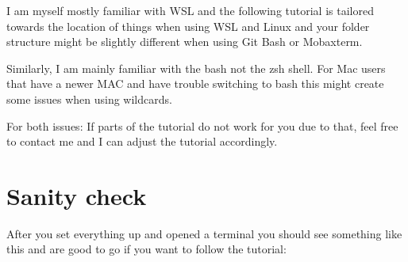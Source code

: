 \documentclass[
  letterpaper,
  DIV=11,
  numbers=noendperiod]{scrreprt}
\begin{document}
\begin{tcolorbox}[enhanced jigsaw, opacitybacktitle=0.6, leftrule=.75mm, colframe=quarto-callout-note-color-frame, breakable, colbacktitle=quarto-callout-note-color!10!white, rightrule=.15mm, opacityback=0, left=2mm, title=\textcolor{quarto-callout-note-color}{\faInfo}\hspace{0.5em}{Note}, coltitle=black, colback=white, toptitle=1mm, toprule=.15mm, titlerule=0mm, arc=.35mm, bottomrule=.15mm, bottomtitle=1mm]

I am myself mostly familiar with WSL and the following tutorial is
tailored towards the location of things when using WSL and Linux and
your folder structure might be slightly different when using Git Bash or
Mobaxterm.

Similarly, I am mainly familiar with the bash not the zsh shell. For Mac
users that have a newer MAC and have trouble switching to bash this
might create some issues when using wildcards.

For both issues: If parts of the tutorial do not work for you due to
that, feel free to contact me and I can adjust the tutorial accordingly.

\end{tcolorbox}

\section{Sanity check}\label{sanity-check}

After you set everything up and opened a terminal you should see
something like this and are good to go if you want to follow the
tutorial:
\end{document}
